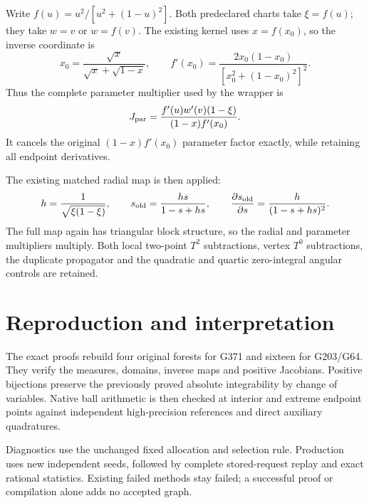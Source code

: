 \documentclass[11pt]{article}
\begin{document}
Write $f(u)=u^2/[u^2+(1-u)^2]$.
Both predeclared charts take $\xi=f(u)$; they take $w=v$ or $w=f(v)$.
The existing kernel uses $x=f(x_0)$, so the inverse coordinate is
\[
 x_0=\frac{\sqrt x}{\sqrt x+\sqrt{1-x}},\qquad
 f'(x_0)=\frac{2x_0(1-x_0)}{[x_0^2+(1-x_0)^2]^2}.
\]
Thus the complete parameter multiplier used by the wrapper is
\[
 J_{\rm par}
 =\frac{f'(u)w'(v)(1-\xi)}{(1-x)f'(x_0)}.
\]
It cancels the original $(1-x)f'(x_0)$ parameter factor exactly,
while retaining all endpoint derivatives.

The existing matched radial map is then applied:
\[
 h=\frac1{\sqrt{\xi(1-\xi)}},\qquad
 s_{\rm old}=\frac{hs}{1-s+hs},\qquad
 \frac{\partial s_{\rm old}}{\partial s}
 =\frac{h}{(1-s+hs)^2}.
\]
The full map again has triangular block structure, so the radial and
parameter multipliers multiply. Both local two-point $T^2$ subtractions,
vertex $T^0$ subtractions, the duplicate propagator and the quadratic and
quartic zero-integral angular controls are retained.

\section{Reproduction and interpretation}
The exact proofs rebuild four original forests for G371 and sixteen for
G203/G64. They verify the measures, domains, inverse maps and positive
Jacobians. Positive bijections preserve the previously proved absolute
integrability by change of variables. Native ball arithmetic is then checked
at interior and extreme endpoint points against independent high-precision
references and direct auxiliary quadratures.

Diagnostics use the unchanged fixed allocation and selection rule.
Production uses new independent seeds, followed by complete stored-request
replay and exact rational statistics. Existing failed methods stay failed;
a successful proof or compilation alone adds no accepted graph.
\end{document}

